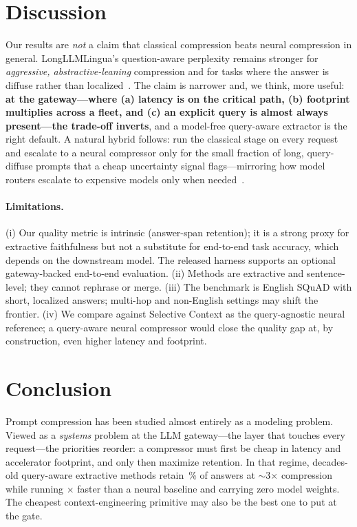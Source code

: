 \documentclass[11pt]{article}
\begin{document}
\section{Discussion}
Our results are \emph{not} a claim that classical compression beats neural compression
in general. LongLLMLingua's question-aware perplexity remains stronger for
\emph{aggressive, abstractive-leaning} compression and for tasks where the answer is
diffuse rather than localized~\cite{longllmlingua,llmlingua2}. The claim is narrower and,
we think, more useful: \textbf{at the gateway---where (a) latency is on the critical
path, (b) footprint multiplies across a fleet, and (c) an explicit query is almost
always present---the trade-off inverts}, and a model-free query-aware extractor is the
right default. A natural hybrid follows: run the classical stage on every request and
escalate to a neural compressor only for the small fraction of long, query-diffuse
prompts that a cheap uncertainty signal flags---mirroring how model routers escalate to
expensive models only when needed~\cite{routellm}.

\paragraph{Limitations.} (i) Our quality metric is intrinsic (answer-span retention);
it is a strong proxy for extractive faithfulness but not a substitute for end-to-end
task accuracy, which depends on the downstream model. The released harness supports an
optional gateway-backed end-to-end evaluation. (ii) Methods are extractive and
sentence-level; they cannot rephrase or merge. (iii) The benchmark is English SQuAD with
short, localized answers; multi-hop and non-English settings may shift the frontier.
(iv) We compare against Selective Context as the query-agnostic neural reference; a
query-aware neural compressor would close the quality gap at, by construction, even
higher latency and footprint.

\section{Conclusion}
Prompt compression has been studied almost entirely as a modeling problem. Viewed as a
\emph{systems} problem at the LLM gateway---the layer that touches every request---the
priorities reorder: a compressor must first be cheap in latency and accelerator
footprint, and only then maximize retention. In that regime, decades-old query-aware
extractive methods retain \retBMQ\,\% of answers at $\sim$3$\times$ compression while
running \latSpeedup$\times$ faster than a neural baseline and carrying zero model
weights. The cheapest context-engineering primitive may also be the best one to put at
the gate.
\end{document}
